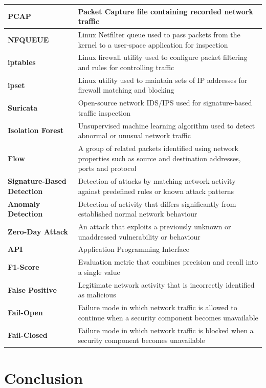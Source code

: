 {\begin{longtable}{|>{\raggedright\arraybackslash}p{}|>{\raggedright\arraybackslash}p{}|}
\textbf{PCAP} & Packet Capture file containing recorded network traffic \\ \hline
\textbf{NFQUEUE} & Linux Netfilter queue used to pass packets from the kernel to a user-space application for inspection \\ \hline
\textbf{iptables} & Linux firewall utility used to configure packet filtering and rules for controlling traffic \\ \hline
\textbf{ipset} & Linux utility used to maintain sets of IP addresses for firewall matching and blocking \\ \hline
\textbf{Suricata} & Open-source network IDS/IPS used for signature-based traffic inspection \\ \hline
\textbf{Isolation Forest} & Unsupervised machine learning algorithm used to detect abnormal or unusual network traffic \\ \hline
\textbf{Flow} & A group of related packets identified using network properties such as source and destination addresses, ports and protocol \\ \hline
\textbf{Signature-Based Detection} & Detection of attacks by matching network activity against predefined rules or known attack patterns \\ \hline
\textbf{Anomaly Detection} & Detection of activity that differs significantly from established normal network behaviour \\ \hline
\textbf{Zero-Day Attack} & An attack that exploits a previously unknown or unaddressed vulnerability or behaviour \\ \hline
\textbf{API} & Application Programming Interface \\ \hline
\textbf{F1-Score} & Evaluation metric that combines precision and recall into a single value \\ \hline
\textbf{False Positive} & Legitimate network activity that is incorrectly identified as malicious \\ \hline
\textbf{Fail-Open} & Failure mode in which network traffic is allowed to continue when a security component becomes unavailable \\ \hline
\textbf{Fail-Closed} & Failure mode in which network traffic is blocked when a security component becomes unavailable \\ \hline
\end{longtable}
}

\section{Conclusion}\label{sec:1.4}


